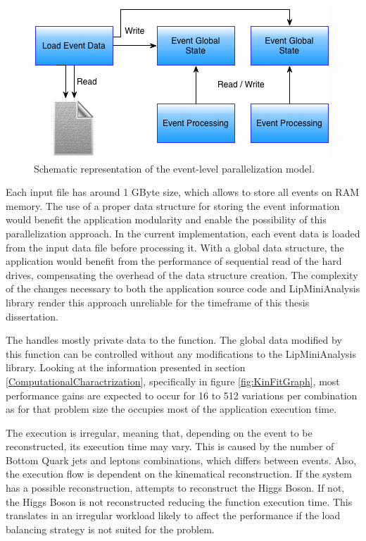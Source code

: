 \begin{figure}[!htp]
	\begin{center}
		\includegraphics[scale=0.7]{../../common/img/2global_states_par.png}
		\caption{Schematic representation of the event-level parallelization model.}
		\label{fig:EventParallelization}
	\end{center}
\end{figure}

Each input file has around 1 GByte size, which allows to store all events on RAM memory. The use of a proper data structure for storing the event information would benefit the application modularity and enable the possibility of this parallelization approach. In the current implementation, each event data is loaded from the input data file before processing it. With a global data structure, the application would benefit from the performance of sequential read of the hard drives, compensating the overhead of the data structure creation. The complexity of the changes necessary to both the application source code and LipMiniAnalysis library render this approach unreliable for the timeframe of this thesis dissertation.

The \ttDilepKinFit handles mostly private data to the function. The global data modified by this function can be controlled without any modifications to the LipMiniAnalysis library. Looking at the information presented in section \ref{ComputationalCharactrization}, specifically in figure \ref{fig:KinFitGraph}, most performance gains are expected to occur for 16 to 512 variations per combination as for that problem size the \ttDilepKinFit occupies most of the application execution time.

The \ttDilepKinFit execution is irregular, meaning that, depending on the event to be reconstructed, its execution time may vary. This is caused by the number of Bottom Quark jets and leptons combinations, which differs between events. Also, the execution flow is dependent on the kinematical reconstruction. If the \ttbar system has a possible reconstruction, \ttDilepKinFit attempts to reconstruct the Higgs Boson. If not, the Higgs Boson is not reconstructed reducing the function execution time. This translates in an irregular workload likely to affect the performance if the load balancing strategy is not suited for the problem.

